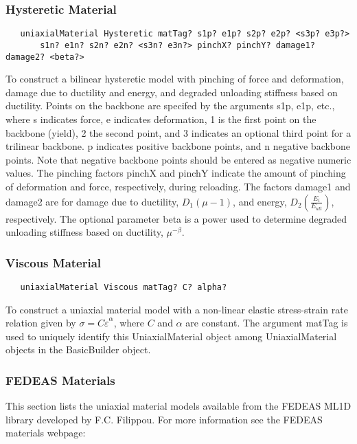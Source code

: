 \documentclass[12pt]{article}
\begin{document}
\subsubsection{Hysteretic Material}
{\sf\small
\begin{verbatim}
   uniaxialMaterial Hysteretic matTag? s1p? e1p? s2p? e2p? <s3p? e3p?>
       s1n? e1n? s2n? e2n? <s3n? e3n?> pinchX? pinchY? damage1? damage2? <beta?>
\end{verbatim}
}

\noindent To construct a bilinear hysteretic model with pinching of force and
deformation, damage due to ductility and energy, and degraded unloading 
stiffness based on ductility. Points on the backbone are specifed by the
arguments s1p, e1p, etc., where s indicates force, e indicates deformation,
1 is the first point on the backbone (yield), 2 the second point, and 3 indicates
an optional third point for a trilinear backbone. p indicates positive backbone
points, and n negative backbone points. Note that negative backbone points
should be entered as negative numeric values. The pinching factors pinchX and
pinchY indicate the amount of pinching of deformation and force, respectively,
during reloading. The factors damage1 and damage2 are for damage due 
to ductility, $D_1(\mu-1)$, and energy, $D_2(\frac{E_i}{E_{ult}})$, respectively. 
The optional parameter beta is a power used to determine degraded
unloading stiffness based on ductility, $\mu^{-\beta}$.

\subsubsection{Viscous Material}
{\sf\small
\begin{verbatim}
   uniaxialMaterial Viscous matTag? C? alpha?
\end{verbatim}
}

\noindent To construct a uniaxial material model with a non-linear elastic
stress-strain rate relation given by $\sigma = C\dot{\varepsilon}^\alpha$, where $C$
and $\alpha$ are constant.
The argument matTag is used to uniquely identify this UniaxialMaterial object 
among UniaxialMaterial objects in the BasicBuilder object.


\subsubsection{FEDEAS Materials}
This section lists the uniaxial material models available from the FEDEAS ML1D
library developed by F.C. Filippou. For more information see the FEDEAS materials webpage:
\end{document}
